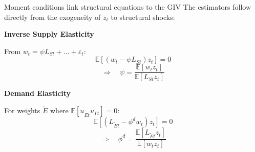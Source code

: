 \documentclass[aspectratio=169,11pt]{beamer}
\begin{document}
\begin{frame}[shrink]{Moment conditions link structural equations to the GIV}
    \vspace{0.5cm}
    \centering
    The estimators follow directly from the exogeneity of $z_t$ to structural shocks:

    \vspace{0.6cm}
    \begin{minipage}{0.48\textwidth}
        \centering
        \textbf{Inverse Supply Elasticity}

        \vspace{0.2cm}
        From $w_t = \psi L_{St} + \dots + \varepsilon_t$:
        \begin{equation*}
            \mathbb{E}[(w_t - \psi L_{St}) z_t] = 0
        \end{equation*}
        \vspace{0.1cm}
        \begin{equation*}
            \Rightarrow \quad \psi = \frac{\mathbb{E}[w_t z_t]}{\mathbb{E}[L_{St} z_t]}
        \end{equation*}
    \end{minipage}
    \hfill
    \begin{minipage}{0.48\textwidth}
        \centering
        \textbf{Demand Elasticity}

        \vspace{0.2cm}
        For weights $\tilde{E}$ where $\mathbb{E}[u_{\tilde{E}t} u_{\Gamma t}] = 0$:
        \begin{equation*}
            \mathbb{E}[(L_{\tilde{E}t} - \phi^d w_t) z_t] = 0
        \end{equation*}
        \vspace{0.1cm}
        \begin{equation*}
            \Rightarrow \quad \phi^d = \frac{\mathbb{E}[L_{\tilde{E}t} z_t]}{\mathbb{E}[w_t z_t]}
        \end{equation*}
    \end{minipage}
    \vspace{0.1cm}
    \hfill \hyperlink{src_propositions}{}
\end{frame}
\end{document}
